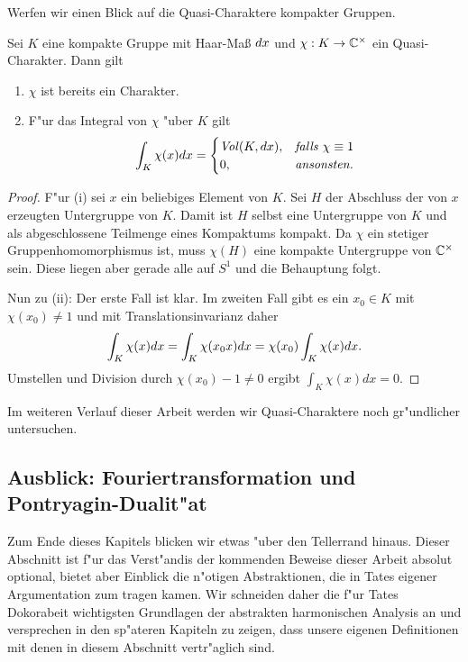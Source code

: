 	Werfen wir einen Blick auf die Quasi-Charaktere kompakter Gruppen.
	\begin{lemma}\label{Lemma:trivialerCharAufKompakt}
		Sei $K$ eine kompakte Gruppe mit Haar-Maß $d{x}$ und $\chi: K \to \mathbb{C}^\times$ ein Quasi-Charakter. Dann gilt
		\begin{enumerate}[label=\emph{(\roman*)}]
				\item $\chi$ ist bereits ein Charakter.
				\item F"ur das Integral von $\chi$ "uber $K$ gilt
					\begin{align*}
						\int_K \chi(x) d{x} = 
							\begin{cases}
								\text{\emph{Vol}}(K, d{x}),	& \text{\emph{falls} } \chi\equiv 1\\
								0,					& \text{\emph{ansonsten.}}
							\end{cases}
					\end{align*}
		\end{enumerate}
	\end{lemma}
	\begin{proof}
		F"ur (i) sei $x$ ein beliebiges Element von $K$. 
		Sei $H$ der Abschluss der von $x$ erzeugten Untergruppe von $K$.
		Damit ist $H$ selbst eine Untergruppe von $K$ und als abgeschlossene Teilmenge eines Kompaktums kompakt.
		Da $\chi$ ein stetiger Gruppenhomomorphismus ist, muss $\chi(H)$ eine kompakte Untergruppe von $\mathbb{C}^\times$ sein.
		Diese liegen aber gerade alle auf $S^1$ und die Behauptung folgt.
		
		Nun zu (ii): Der erste Fall ist klar. 
		Im zweiten Fall gibt es ein $x_0 \in K$ mit $\chi(x_0) \not=1$ und mit Translationsinvarianz daher
		\begin{align*}
			\int_K \chi(x)d{x} = \int_K\chi(x_0x)d{x} = \chi(x_0)\int_K\chi(x)d{x}.
		\end{align*}
		Umstellen und Division durch $\chi(x_0) - 1 \not=0$ ergibt $\int_K \chi(x)dx = 0$.
	\end{proof}
	Im weiteren Verlauf dieser Arbeit werden wir Quasi-Charaktere noch gr"undlicher untersuchen.
	
\subsection{Ausblick: Fouriertransformation und Pontryagin-Dualit"at}
	Zum Ende dieses Kapitels blicken wir etwas "uber den Tellerrand hinaus.
	Dieser Abschnitt ist f"ur das Verst"andis der kommenden Beweise dieser Arbeit absolut optional, bietet aber Einblick die n"otigen Abstraktionen, die in Tates eigener Argumentation zum tragen kamen.
	Wir schneiden daher die f"ur Tates Dokorabeit wichtigsten Grundlagen der abstrakten harmonischen Analysis an und versprechen in den sp"ateren Kapiteln zu zeigen, dass unsere eigenen Definitionen mit denen in diesem Abschnitt vertr"aglich sind.
	
